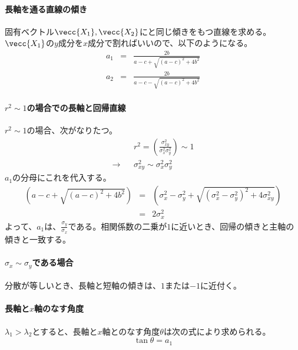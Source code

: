 \paragraph{長軸を通る直線の傾き}
固有ベクトル$\vecc{X_1},\vecc{X_2}$にと同じ傾きをもつ直線を求める。
$\vecc{X_1}$の$y$成分を$x$成分で割ればいいので、以下のようになる。
\begin{eqnarray*}
 a_1 &=& \frac{2b}{a-c+\sqrt{(a-c)^2+4b^2}} \\
 a_2 &=& \frac{2b}{a-c-\sqrt{(a-c)^2+4b^2}} 
\end{eqnarray*}

\paragraph{$r^2\sim 1$の場合での長軸と回帰直線}
$r^2\sim 1$の場合、次がなりたつ。
\begin{eqnarray*}
 && r^2 = \left(\frac{\sigma_{xy}^2}{\sigma_x^2 \sigma_y^2} \right) \sim 1\\
 \rightarrow && \sigma_{xy}^2 \sim \sigma_x^2\sigma_y^2
\end{eqnarray*}
$a_1$の分母にこれを代入する。
\begin{eqnarray*}
 (a-c+\sqrt{(a-c)^2+4b^2}) &=& (\sigma_x^2-\sigma_y^2+\sqrt{(\sigma_x^2-\sigma_y^2)^2+4\sigma_{xy}^2})\\
 &=& 2\sigma_x^2
\end{eqnarray*}
よって、$a_1$は、$\frac{\sigma_{y}}{\sigma_x}$である。相関係数の二乗が$1$に近いとき、回帰の傾きと主軸の傾きと一致する。

\paragraph{$\sigma_x\sim \sigma_y$である場合}
分散が等しいとき、長軸と短軸の傾きは、$1$または$-1$に近付く。


\paragraph{長軸と$x$軸のなす角度}
$\lambda_1>\lambda_2$とすると、長軸と$x$軸とのなす角度$\theta$は次の式により求められる。
\begin{equation*}
 \tan \theta = a_1
\end{equation*}


